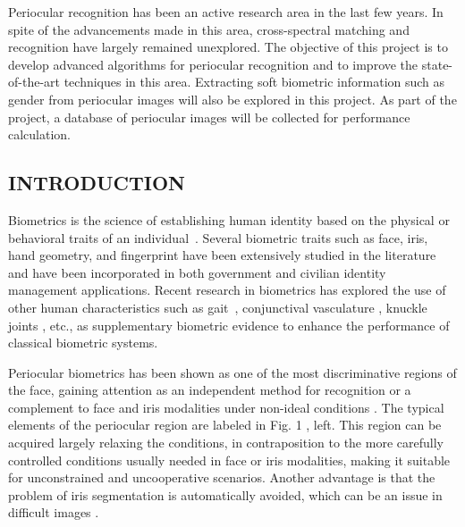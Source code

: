 \documentclass{article} %
\begin{document}
\noindent                            Periocular recognition has been an active research area in the last few years. In spite of the advancements made in this area, cross-spectral matching and recognition have largely remained unexplored. The objective of this project is to develop advanced algorithms for periocular recognition and to improve the state-of-the-art techniques in this area. Extracting soft biometric information such as gender from periocular images will also be explored in this project. As part of the project, a database of periocular images will be collected for performance calculation.

\noindent 

\noindent 

\noindent  

\noindent 

\noindent  

\noindent  


\subsection{                                     INTRODUCTION }

\noindent  

\noindent                        Biometrics is the science of establishing human identity based on the physical or behavioral traits of an individual~. Several biometric traits such as face, iris, hand geometry, and fingerprint have been extensively studied in the literature and have been incorporated in both government and civilian identity management applications. Recent research in biometrics has explored the use of other human characteristics such as gait~, conjunctival vasculature , knuckle joints , etc., as supplementary biometric evidence to enhance the performance of classical biometric systems.                   

\noindent                    Periocular biometrics has been shown as one of the most discriminative regions of the face, gaining attention as an independent method for recognition or a complement to face and iris modalities under non-ideal conditions . The typical elements of the periocular region are labeled in Fig. 1 , left. This region can be acquired largely relaxing the conditions, in contraposition to the more carefully controlled conditions usually needed in face or iris modalities, making it suitable for unconstrained and uncooperative scenarios. Another advantage is that the problem of iris segmentation is automatically avoided, which can be an issue in difficult images . 
\end{document}
